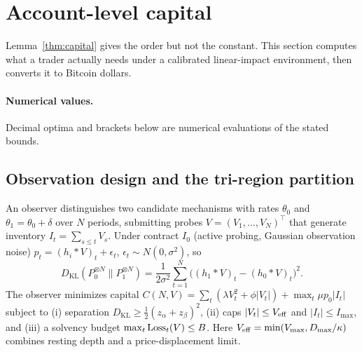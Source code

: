 \documentclass[12pt]{article}
\theoremstyle{definition}
\theoremstyle{remark}
\newcommand{\KL}{D_{\mathrm{KL}}}
\begin{document}
\section{Account-level capital}\label{sec:account}

Lemma~\ref{thm:capital} gives the order but not the constant. This section computes what a trader actually needs under a calibrated linear-impact environment, then converts it to Bitcoin dollars.

\paragraph{Numerical values.} Decimal optima and brackets below are numerical evaluations of the stated bounds.

\subsection{Observation design and the tri-region partition}

An observer distinguishes two candidate mechanisms with rates $\theta_0$ and $\theta_1=\theta_0+\delta$ over $N$ periods, submitting probes $V=(V_1,\ldots,V_N)^\top$ that generate inventory $I_t=\sum_{s\le t}V_s$. Under contract $I_0$ (active probing, Gaussian observation noise) $p_t=(h_i*V)_t+\epsilon_t$, $\epsilon_t\sim N(0,\sigma^2)$, so
\begin{equation}\label{eq:klconv}
\KL(P_0^{\otimes N}\|P_1^{\otimes N})=\frac1{2\sigma^2}\sum_{t=1}^N\bigl((h_1*V)_t-(h_0*V)_t\bigr)^2 .
\end{equation}
The observer minimizes capital $C(N,V)=\sum_t(\lambda V_t^2+\phi|V_t|)+\max_t\mu p_0|I_t|$ subject to (i) separation $\KL\ge\tfrac12(z_\alpha+z_\beta)^2$, (ii) caps $|V_t|\le V_{\rm eff}$ and $|I_t|\le I_{\max}$, and (iii) a solvency budget $\max_t{\rm Loss}_t(V)\le B$. Here $V_{\rm eff}=\min(V_{\max},D_{\max}/\kappa)$ combines resting depth and a price-displacement limit.
\end{document}
